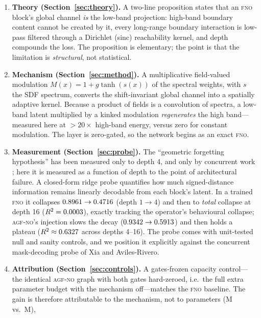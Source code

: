 \documentclass[11pt]{article}
\theoremstyle{definition}
\newcommand{\fno}{\textsc{fno}}
\newcommand{\agfno}{\textsc{agf-no}}
\newcommand{\Rtwo}{R^2}
\begin{document}
\begin{enumerate}
\item \textbf{Theory (Section~\ref{sec:theory}).} A two-line proposition
      states that an \fno{} block's global channel \emph{is} the low-band
      projection: high-band boundary content cannot be created by it, every
      long-range boundary interaction is low-pass filtered through a Dirichlet
      (sinc) reachability kernel, and depth compounds the loss. The
      proposition is elementary; the point is that the limitation is
      \emph{structural}, not statistical.
\item \textbf{Mechanism (Section~\ref{sec:method}).} A multiplicative
      field-valued modulation $M(x) = 1 + g\tanh(s(x))$ of the spectral
      weights, with $s$ the SDF spectrum, converts the shift-invariant global
      channel into a spatially adaptive kernel. Because a product of fields is
      a convolution of spectra, a low-band latent multiplied by a kinked
      modulation \emph{regenerates} the high band---measured here at
      $>20\times$ high-band energy, versus zero for constant modulation. The
      layer is zero-gated, so the network begins as an exact \fno{}.
\item \textbf{Measurement (Section~\ref{sec:probe}).} The ``geometric
      forgetting hypothesis'' has been measured only to depth 4, and only by
      concurrent work \citep{xia2026forgetting}; here it is measured as a
      function of depth to the point of architectural failure. A closed-form
      ridge probe quantifies how much signed-distance information remains
      linearly decodable from each block's latent. In a trained \fno{} it
      collapses $0.8961 \to 0.4716$ (depth $1\!\to\!4$) and then to
      \emph{total} collapse at depth 16 ($\Rtwo = \ProbeExtFnoDSixteen$),
      exactly tracking the operator's behavioural collapse;
      \agfno{}'s injection slows the decay ($0.9342 \to 0.5913$) and then
      holds a plateau ($\Rtwo \approx \ProbeExtAgfDSixteen$ across depths
      4--16). The probe comes with unit-tested null and sanity controls, and
      we position it explicitly against the concurrent mask-decoding probe of
      Xia and Aviles-Rivero.
\item \textbf{Attribution (Section~\ref{sec:controls}).} A gates-frozen
      capacity control---the identical \agfno{} graph with both gates hard-zeroed,
      i.e.\ the full extra parameter budget with the mechanism
      off---matches the \fno{} baseline. The gain is therefore attributable to
      the mechanism, not to parameters (\ExpFnoParams{}M vs.\ \ExpAgfParams{}M),

\end{enumerate}
\end{document}

